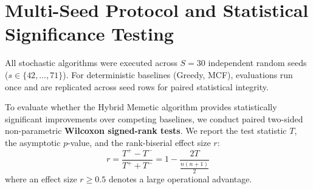 \section{Multi-Seed Protocol and Statistical Significance Testing}
All stochastic algorithms were executed across $S = 30$ independent random seeds ($s \in \{42, \dots, 71\}$). For deterministic baselines (Greedy, MCF), evaluations run once and are replicated across seed rows for paired statistical integrity.

To evaluate whether the Hybrid Memetic algorithm provides statistically significant improvements over competing baselines, we conduct paired two-sided non-parametric \textbf{Wilcoxon signed-rank tests}. We report the test statistic $T$, the asymptotic $p$-value, and the rank-biserial effect size $r$:
\begin{equation}
    r = \frac{T^+ - T^-}{T^+ + T^-} = 1 - \frac{2T}{\frac{n(n+1)}{2}}
\end{equation}
where an effect size $r \ge 0.5$ denotes a large operational advantage.

